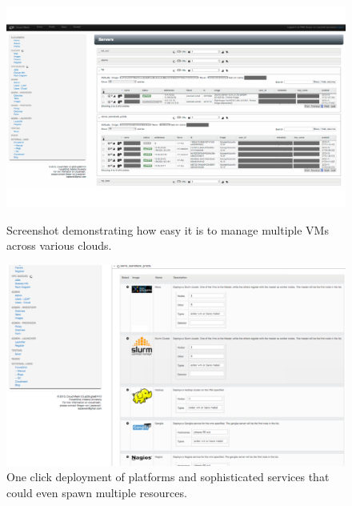 \documentclass{tex/sig-alternate-2013}
\begin{document}
\begin{figure}[p]
    \includegraphics[width=1.0\columnwidth]{images/instances.pdf}
  \caption{Screenshot demonstrating how easy it is to manage multiple VMs across various clouds.}\label{F:instances}
  \centering
    \includegraphics[width=1.0\columnwidth]{images/oneclick.pdf}
  \caption{One click deployment of platforms and sophisticated
    services that could even spawn multiple resources.}\label{F:oneclick}
\end{figure}
\end{document}
